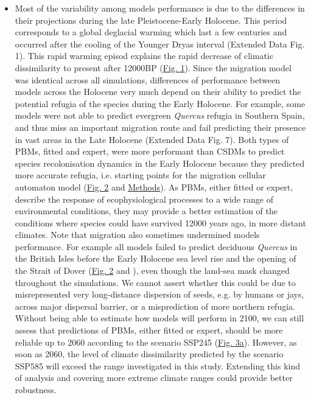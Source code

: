 \documentclass[pdflatex, sn-nature]{sn-jnl}%
\begin{document}
\begin{itemize}
\item Most of the variability among models performance is due to the differences in their projections during the late Pleistocene-Early Holocene. This period  corresponds to a global deglacial warming which last a few centuries and occurred after the cooling of the Younger Dryas interval  (Extended Data Fig. 1). This rapid warming episod explains the rapid decrease of climatic dissimilarity to present after 12000BP (\hyperref[climatic_dissimilarity]{Fig. 1}). Since the migration model was identical across all simulations, differences of performance between models across the Holocene very much depend on their ability to predict the potential refugia of the species during the Early Holocene. For example, some models were not able to predict evergreen \emph{Quercus} refugia in Southern Spain, and thus miss an important migration route and fail predicting their presence in vast areas in the Late Holocene (Extended Data Fig. 7). Both types of PBMs, fitted and expert, were more performant than CSDMs to predict species recolonisation dynamics in the Early Holocene because they predicted more accurate refugia, i.e. starting points for the migration cellular automaton model (\hyperref[quercus_migration]{Fig. 2} and \hyperref[methods]{Methods}). 
As PBMs, either fitted or expert, describe the response of ecophysiological processes to a wide range of environmental conditions, they may provide a better estimation of the conditions where species could have survived 12000 years ago, in more distant climates. Note that migration also sometimes undermined models performance. For example all models failed to predict deciduous \emph{Quercus} in the British Isles before the Early Holocene sea level rise and the opening of the Strait of Dover (\hyperref[quercus_migration]{Fig. 2} and \cite{Smith2011}), even though the land-sea mask changed throughout the simulations. We cannot assert whether this could be due to misrepresented very long-distance dispersion of seeds, e.g. by humans or jays, across major dispersal barrier, or a misprediction of more northern refugia.
Without being able to estimate how models will perform in 2100, we can still assess that predictions of PBMs, either fitted or expert, should be more reliable up to 2060 according to the scenario SSP245 (\hyperref[past_performance]{Fig. 3a}). However, as soon as 2060, the level of climate dissimilarity predicted by the scenario SSP585 will exceed the range investigated in this study. Extending this kind of analysis and covering more extreme climate ranges could provide  better robustness.


\end{itemize}
\end{document}
